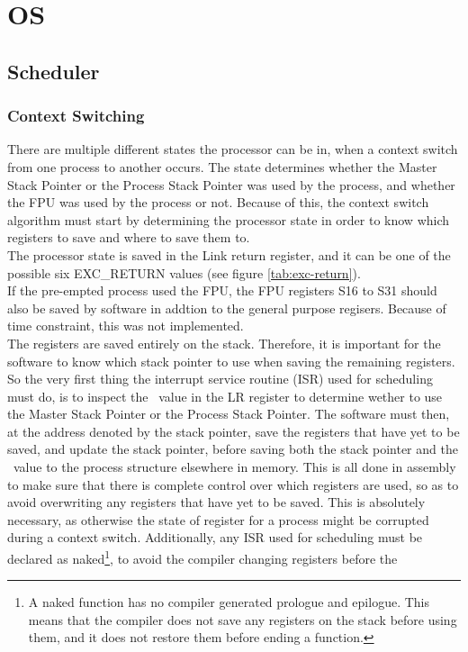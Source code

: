\section{OS}

\subsection{Scheduler}

\subsubsection{Context Switching}
There are multiple different states the processor can be in, when a context 
switch from one process to another occurs. The state determines whether the
Master Stack Pointer or the Process Stack Pointer was used by the process,
and whether the FPU was used by the process or not. Because of this, the context
switch algorithm must start by determining the processor state in order to know
which registers
to save and where to save them to.\\
The processor state is saved in the Link return register, and it can be one of
the possible six EXC\_RETURN values (see figure \ref{tab:exc-return}).\\
If the pre-empted process used the FPU, the FPU registers S16 to S31
should also be saved by software in addtion to the general purpose regisers.
Because of time constraint, this was not implemented.\\
The registers are saved entirely on the stack. Therefore, it is important for
the software to know which
stack pointer to use when saving the remaining registers. So the very first
thing the interrupt service routine (ISR) used for scheduling must do, is to inspect
the \excreturn\ value in the LR register to determine wether to use the 
Master Stack Pointer or the Process Stack Pointer. The software must then, at 
the address denoted by the stack pointer, save the registers that have yet to be
saved, and update the stack pointer, before saving both the stack pointer and
the \excreturn\ value to the process structure elsewhere in memory. This is all
done in assembly to make sure that there is complete control over which
registers are used, so as to avoid overwriting any registers that have yet to be
saved. This is absolutely necessary, as otherwise the state of register for a
process might be corrupted during a context switch. Additionally, any ISR used
for scheduling must be declared as naked\footnote{A naked function has no
compiler generated prologue and epilogue. This means that the compiler does not
save any registers on the stack before using them, and it does not restore them
before ending a function.}, to avoid the compiler changing registers before the
